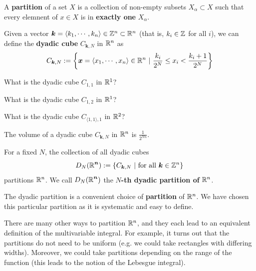 \begin{definition}
    A \textbf{partition} of a set $X$ is a collection of non-empty subsets $X_\alpha \subset X$ such that every elemnent of $x \in X$ is in \textbf{exactly one} $X_\alpha$.
\end{definition}

\begin{definition}
    Given a vector $\bm{k} = \langle k_1, \cdots, k_n\rangle \in \mathbb{Z}^n \subset \mathbb{R}^n$ (that is, $k_i \in \mathbb{Z}$ for all $i$), we can define the \textbf{dyadic cube} $C_{\bm{k},N}$ in $\mathbb{R}^n$ as
    $$C_{\bm{k},N} := \left\{ \bm{x} = \langle x_1, \cdots, x_n\rangle \in \mathbb{R}^n \ | \ \frac{k_i}{2^N} \leq x_i < \frac{k_i+1}{2^N}\right\}$$
    
    \end{definition}

\begin{example}

        What is the dyadic cube $C_{1,1}$ in $\mathbb{R}^1$?
        
        What is the dyadic cube $C_{1,2}$ in $\mathbb{R}^1$?
    

    
        What is the dyadic cube $C_{\langle1,1\rangle,1}$ in $\mathbb{R}^2$?

\end{example}





\begin{proposition}
    The volume of a dyadic cube $C_{\bm{k},N}$ in $\mathbb{R}^n$ is $\frac{1}{2^{Nn}}$.
    \end{proposition}

\begin{proposition}
    For a fixed $N$, the collection of all dyadic cubes $$D_N(\bm{\R^n}) := \left\{C_{\bm{k},N} \ | \ \textnormal{for all} \ \bm{k} \in \Z^n \right\}$$ partitions $\mathbb{R}^n$. We call $D_N(\bm{\mathbb{R}^n})$ the $N$\textbf{-th dyadic partition of} $\mathbb{R}^n$.
    \end{proposition}





The dyadic partition is a convenient choice of \textbf{partition} of $\mathbb{R}^n$. We have chosen this particular partition as it is systematic and easy to define.

There are many other ways to partition $\mathbb{R}^n$, and they each lead to an equivalent definition of the multivariable integral.  For example, it turns out that the partitions do not need to be uniform (e.g. we could take rectangles with differing widths).  Moreover, we could take partitions depending on the range of the function (this leads to the notion of the Lebesgue integral).

